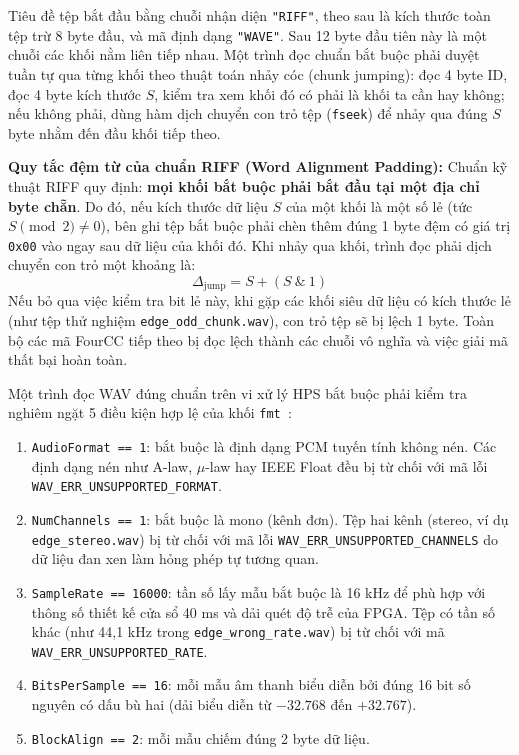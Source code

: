 Tiêu đề tệp bắt đầu bằng chuỗi nhận diện \texttt{"RIFF"}, theo sau là kích thước toàn tệp trừ 8 byte đầu, và mã định dạng \texttt{"WAVE"}. Sau 12 byte đầu tiên này là một chuỗi các khối nằm liên tiếp nhau. Một trình đọc chuẩn bắt buộc phải duyệt tuần tự qua từng khối theo thuật toán nhảy cóc (chunk jumping): đọc 4 byte ID, đọc 4 byte kích thước $S$, kiểm tra xem khối đó có phải là khối ta cần hay không; nếu không phải, dùng hàm dịch chuyển con trỏ tệp (\texttt{fseek}) để nhảy qua đúng $S$ byte nhằm đến đầu khối tiếp theo.

\textbf{Quy tắc đệm từ của chuẩn RIFF (Word Alignment Padding):} Chuẩn kỹ thuật RIFF quy định: \textbf{mọi khối bắt buộc phải bắt đầu tại một địa chỉ byte chẵn}. Do đó, nếu kích thước dữ liệu $S$ của một khối là một số lẻ (tức $S \pmod 2 \neq 0$), bên ghi tệp bắt buộc phải chèn thêm đúng 1 byte đệm có giá trị \texttt{0x00} vào ngay sau dữ liệu của khối đó. Khi nhảy qua khối, trình đọc phải dịch chuyển con trỏ một khoảng là:
\begin{equation}
\Delta_{\text{jump}} = S + (S \ \& \ 1)
\end{equation}
Nếu bỏ qua việc kiểm tra bit lẻ này, khi gặp các khối siêu dữ liệu có kích thước lẻ (như tệp thử nghiệm \texttt{edge\_odd\_chunk.wav}), con trỏ tệp sẽ bị lệch 1 byte. Toàn bộ các mã FourCC tiếp theo bị đọc lệch thành các chuỗi vô nghĩa và việc giải mã thất bại hoàn toàn.

Một trình đọc WAV đúng chuẩn trên vi xử lý HPS bắt buộc phải kiểm tra nghiêm ngặt 5 điều kiện hợp lệ của khối \texttt{fmt~}:
\begin{enumerate}[leftmargin=1.5em, itemsep=2pt]
    \item \texttt{AudioFormat == 1}: bắt buộc là định dạng PCM tuyến tính không nén. Các định dạng nén như A-law, $\mu$-law hay IEEE Float đều bị từ chối với mã lỗi \texttt{WAV\_ERR\_UNSUPPORTED\_FORMAT}.
    \item \texttt{NumChannels == 1}: bắt buộc là mono (kênh đơn). Tệp hai kênh (stereo, ví dụ \texttt{edge\_stereo.wav}) bị từ chối với mã lỗi \texttt{WAV\_ERR\_UNSUPPORTED\_CHANNELS} do dữ liệu đan xen làm hỏng phép tự tương quan.
    \item \texttt{SampleRate == 16000}: tần số lấy mẫu bắt buộc là 16 kHz để phù hợp với thông số thiết kế cửa sổ 40 ms và dải quét độ trễ của FPGA. Tệp có tần số khác (như 44,1 kHz trong \texttt{edge\_wrong\_rate.wav}) bị từ chối với mã \texttt{WAV\_ERR\_UNSUPPORTED\_RATE}.
    \item \texttt{BitsPerSample == 16}: mỗi mẫu âm thanh biểu diễn bởi đúng 16 bit số nguyên có dấu bù hai (dải biểu diễn từ $-32.768$ đến $+32.767$).
    \item \texttt{BlockAlign == 2}: mỗi mẫu chiếm đúng 2 byte dữ liệu.
\end{enumerate}

